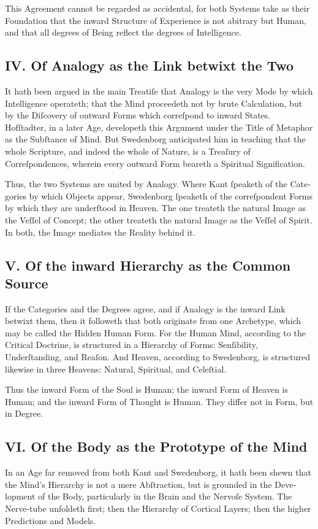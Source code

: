 \documentclass[12pt]{article}
\begin{document}
This Agreement cannot be regarded as accidental, for both Systems take as 
their Foundation that the inward Structure of Experience is not abitrary but 
Human, and that all degrees of Being reflect the degrees of Intelligence.

\subsection*{IV. Of Analogy as the Link betwixt the Two}
It hath been argued in the main Treatiſe that Analogy is the very Mode by 
which Intelligence operateth; that the Mind proceedeth not by brute 
Calculation, but by the Diſcovery of outward Forms which correſpond to inward 
States. Hofſtadter, in a later Age, developeth this Argument under the Title 
of Metaphor as the Subſtance of Mind. But Swedenborg anticipated him in 
teaching that the whole Scripture, and indeed the whole of Nature, is a 
Treaſury of Correſpondences, wherein every outward Form beareth a Spiritual 
Signification.

Thus, the two Systems are united by Analogy. Where Kant ſpeaketh of the 
Cate­gories by which Objects appear, Swedenborg ſpeaketh of the correſpondent 
Forms by which they are underſtood in Heaven. The one treateth the natural 
Image as the Veſſel of Concept; the other treateth the natural Image as the 
Veſſel of Spirit. In both, the Image mediates the Reality behind it.

\subsection*{V. Of the inward Hierarchy as the Common Source}
If the Categories and the Degrees agree, and if Analogy is the inward Link 
betwixt them, then it followeth that both originate from one Archetype, which 
may be called the Hidden Human Form. For the Human Mind, according to the 
Critical Doctrine, is structured in a Hierarchy of Forms: Senſibility, 
Underſtanding, and Reaſon. And Heaven, according to Swedenborg, is structured 
likewise in three Heavens: Natural, Spiritual, and Celeſtial.

Thus the inward Form of the Soul is Human; the inward Form of Heaven is Human; 
and the inward Form of Thought is Human. They differ not in Form, but in 
Degree.

\subsection*{VI. Of the Body as the Prototype of the Mind}
In an Age far removed from both Kant and Swedenborg, it hath been shewn that 
the Mind’s Hierarchy is not a mere Abſtraction, but is grounded in the 
Deve­lopment of the Body, particularly in the Brain and the Nervoſe System. The 
Nerve-tube unfoldeth first; then the Hierarchy of Cortical Layers; then the 
higher Predictions and Models.
\end{document}
